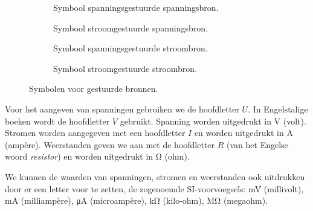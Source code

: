 \begin{figure}[!ht]
\centering
\begin{subfigure}[t]{0.23\textwidth}
\centering
{}
\caption{Symbool spanningsgestuurde spanningsbron.}
\end{subfigure}
\begin{subfigure}[t]{0.23\textwidth}
\centering
{}
\caption{Symbool stroomgestuurde spanningsbron.}
\end{subfigure}
\begin{subfigure}[t]{0.23\textwidth}
\centering
{}
\caption{Symbool spanningsgestuurde stroombron.}
\end{subfigure}
\begin{subfigure}[t]{0.23\textwidth}
\centering
{}
\caption{Symbool stroomgestuurde stroombron.}
\end{subfigure}
\caption{Symbolen voor gestuurde bronnen.}
\label{fig:gelsymbolengestuuurdebronnenen}
\end{figure}

Voor het aangeven van spanningen gebruiken we de hoofdletter $U$. In Engelstalige boeken
wordt de hoofdletter $V$ gebruikt. Spanning worden uitgedrukt in \si{\volt} (volt). Stromen
worden aangegeven met een hoofdletter $I$ en worden uitgedrukt in \si{\ampere} (amp\`ere).
Weerstanden geven we aan met de hoofdletter $R$ (van het Engelse woord \textsl{resistor})
en worden uitgedrukt in \si{\ohm} (ohm).

We kunnen de waarden van spanningen, stromen en weerstanden ook uitdrukken door er een
letter voor te zetten, de zogenoemde SI-voorvoegsels: \si{\milli\volt} (millivolt),
\si{\milli\ampere} (milliamp\`ere), \si{\micro\ampere} (microamp\`ere), \si{\kilo\ohm}
(kilo-ohm), \si{\mega\ohm} (megaohm).

